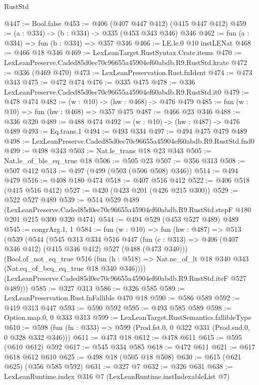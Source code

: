\begin{lexlean}{RustStd}
\begin{coremodule}
@447 := Bool.false
@453 := @406 (@407 @447 @412) (@415 @447 @412)
@459 := (a : @334) -> (b : @334) -> @335 (@453 @343 @346) @346
@462 := fun (a : @334) => fun (b : @334) => @357 @346
@466 := LE.le.{0} @10 instLENat
@468 := @466 @18 @346
@469 := LexLeanTarget.RustSyntax.Crate.items
@470 := LexLeanPreserve.Caded85d0ec70c96655a45904ef60abdb.R9.RustStd.krate
@472 := @336 (@469 @470)
@473 := LexLeanPreservation.Rust.fnIdent
@474 := @473 @343
@475 := @472 @474
@476 := @335 @475
@478 := @336 LexLeanPreserve.Caded85d0ec70c96655a45904ef60abdb.R9.RustStd.it0
@479 := @478 @474
@482 := (w : @10) -> (hw : @468) -> @476 @479
@485 := fun (w : @10) => fun (hw : @468) => @357 @475
@487 := @466 @23 @346
@488 := @336 @320
@489 := @488 @474
@492 := (w : @10) -> (hw : @487) -> @476 @489
@493 := Eq.trans.{1}
@494 := @493 @334
@497 := @494 @475 @479 @489
@498 := LexLeanPreserve.Caded85d0ec70c96655a45904ef60abdb.R9.RustStd.fnd0
@499 := @498 @343
@503 := Nat.le_trans @18 @23 @343
@505 := Nat.le_of_ble_eq_true @18
@506 := @505 @23
@507 := @356 @313
@508 := @507 @412
@513 := @497 (@499 (@503 (@506 @508) @346))
@514 := @494 @479
@516 := @408 @180 @474
@518 := @407 @516 @412
@522 := @406 @518 (@415 @516 @412)
@527 := @420 (@423 @201 (@426 @215 @300))
@529 := @522 @527 @489
@539 := @514
    @529
    @489
    (LexLeanPreserve.Caded85d0ec70c96655a45904ef60abdb.R9.RustStd.stepF
      @180
      @201
      @215
      @300
      @320
      @474)
@544 := @494 @529 (@453 @527 @489) @489
@545 := congrArg.{1, 1}
@584 := fun (w : @10) =>
  fun (hw : @487) =>
  @513
    (@539
      (@544
        (@545
          @313
          @334
          @516
          @447
          (fun (c : @313) => @406 (@407 @346 @412) (@415 @346 @412) @527 (@488 (@473 @340)))
          (Bool.of_not_eq_true
            @516
            (fun (h : @518) => Nat.ne_of_lt @18 @340 @343 (Nat.eq_of_beq_eq_true @18 @340 @346))))
        (LexLeanPreserve.Caded85d0ec70c96655a45904ef60abdb.R9.RustStd.iteF @527 @489)))
@585 := @327 @313
@586 := @326 @585
@589 := LexLeanPreservation.Rust.fnFallible @470 @18
@590 := @586 @589
@592 := @419 @313 @447
@593 := @590 @592
@595 := @493 @585 @589
@598 := Option.map.{0, 0} @333 @313
@599 := LexLeanTarget.RustSemantics.fallibleType
@610 := @598 (fun (fn : @333) => @599 (Prod.fst.{0, 0} @322 @331 (Prod.snd.{0, 0} @328 @332 @346)))
@611 := @473 @18
@612 := @478 @611
@615 := @595 (@610 @612) @592
@617 := @545 @334 @585
@618 := @472 @611
@621 := @617 @618 @612 @610
@625 := @498 @18 (@505 @18 @508)
@630 := @615 (@621 @625) (@356 @585 @592)
@631 := @327 @7
@632 := @326 @631
@638 := LexLeanRuntime.index @316 @7 (LexLeanRuntime.instIndexableList @7)

\end{coremodule}
\end{lexlean}
